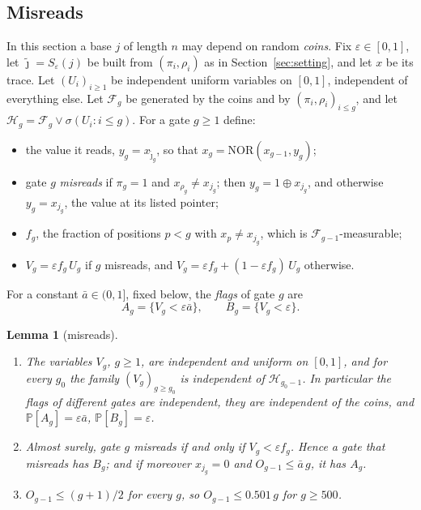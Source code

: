 \documentclass[11pt]{amsart}
\newtheorem{lemma}[theorem]{Lemma}
\theoremstyle{definition}
\theoremstyle{remark}
\newcommand{\eps}{\varepsilon}
\newcommand{\jt}{\tilde{\jmath}}
\newcommand{\NOR}{\mathrm{NOR}}
\newcommand{\PP}{\mathbb{P}}
\newcommand{\cF}{\mathcal{F}}
\begin{document}
\subsection{Misreads}

In this section a base $j$ of length $n$ may depend on random \emph{coins}. Fix $\eps\in[0,1]$, let
$\jt=S_\eps(j)$ be built from $(\pi_i,\rho_i)$ as in Section~\ref{sec:setting}, and let $x$ be its
trace. Let $(U_i)_{i\ge1}$ be independent uniform variables on $[0,1]$, independent of everything
else. Let $\cF_g$ be generated by the coins and by $(\pi_i,\rho_i)_{i\le g}$, and let
$\mathcal H_g=\cF_g\vee\sigma(U_i:i\le g)$. For a gate $g\ge1$ define:
\begin{itemize}[leftmargin=2em]
\item the value it reads, $y_g=x_{\jt_g}$, so that $x_g=\NOR(x_{g-1},y_g)$;
\item gate $g$ \emph{misreads} if $\pi_g=1$ and $x_{\rho_g}\ne x_{j_g}$; then $y_g=1\oplus x_{j_g}$, and
otherwise $y_g=x_{j_g}$, the value at its listed pointer;
\item $f_g$, the fraction of positions $p<g$ with $x_p\ne x_{j_g}$, which is $\cF_{g-1}$-measurable;
\item $V_g=\eps f_g\,U_g$ if $g$ misreads, and $V_g=\eps f_g+(1-\eps f_g)\,U_g$ otherwise.
\end{itemize}
For a constant $\bar a\in(0,1]$, fixed below, the \emph{flags} of gate $g$ are
\[
A_g=\{V_g<\eps\bar a\},\qquad B_g=\{V_g<\eps\}.
\]

\begin{lemma}[misreads]\label{lem:misread}
\begin{enumerate}[label=(\alph*),leftmargin=2.4em]
\item The variables $V_g$, $g\ge1$, are independent and uniform on $[0,1]$, and for every $g_0$ the
family $(V_g)_{g\ge g_0}$ is independent of $\mathcal H_{g_0-1}$. In particular the flags of
different gates are independent, they are independent of the coins, and $\PP[A_g]=\eps\bar a$,
$\PP[B_g]=\eps$.
\item Almost surely, gate $g$ misreads if and only if $V_g<\eps f_g$. Hence a gate that misreads has
$B_g$; and if moreover $x_{j_g}=0$ and $O_{g-1}\le\bar a\,g$, it has $A_g$.
\item $O_{g-1}\le(g+1)/2$ for every $g$, so $O_{g-1}\le0.501\,g$ for $g\ge500$.
\end{enumerate}
\end{lemma}
\end{document}
